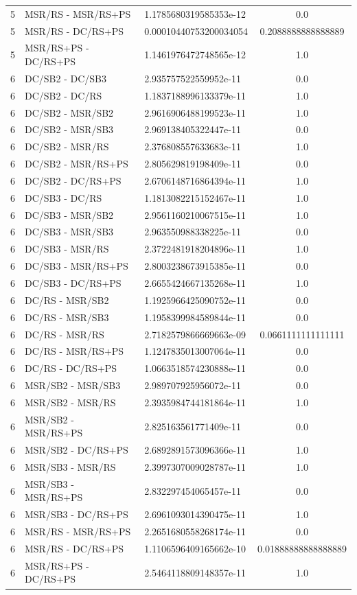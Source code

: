 \documentclass[10pt,a4paper]{article}
\begin{document}
\begin{longtable}{c l l c}
5 & MSR/RS - MSR/RS+PS & 1.1785680319585353e-12 & 0.0 \\
5 & MSR/RS - DC/RS+PS & 0.00010440753200034054 & 0.2088888888888889 \\
5 & MSR/RS+PS - DC/RS+PS & 1.1461976472748565e-12 & 1.0 \\
\midrule
6 & DC/SB2 - DC/SB3 & 2.935757522559952e-11 & 0.0 \\
6 & DC/SB2 - DC/RS & 1.1837188996133379e-11 & 1.0 \\
6 & DC/SB2 - MSR/SB2 & 2.9616906488199523e-11 & 1.0 \\
6 & DC/SB2 - MSR/SB3 & 2.969138405322447e-11 & 0.0 \\
6 & DC/SB2 - MSR/RS & 2.376808557633683e-11 & 1.0 \\
6 & DC/SB2 - MSR/RS+PS & 2.805629819198409e-11 & 0.0 \\
6 & DC/SB2 - DC/RS+PS & 2.6706148716864394e-11 & 1.0 \\
6 & DC/SB3 - DC/RS & 1.1813082215152467e-11 & 1.0 \\
6 & DC/SB3 - MSR/SB2 & 2.9561160210067515e-11 & 1.0 \\
6 & DC/SB3 - MSR/SB3 & 2.963550988338225e-11 & 0.0 \\
6 & DC/SB3 - MSR/RS & 2.3722481918204896e-11 & 1.0 \\
6 & DC/SB3 - MSR/RS+PS & 2.8003238673915385e-11 & 0.0 \\
6 & DC/SB3 - DC/RS+PS & 2.6655424667135268e-11 & 1.0 \\
6 & DC/RS - MSR/SB2 & 1.1925966425090752e-11 & 0.0 \\
6 & DC/RS - MSR/SB3 & 1.1958399984589844e-11 & 0.0 \\
6 & DC/RS - MSR/RS & 2.7182579866669663e-09 & 0.0661111111111111 \\
6 & DC/RS - MSR/RS+PS & 1.1247835013007064e-11 & 0.0 \\
6 & DC/RS - DC/RS+PS & 1.0663518574230888e-11 & 0.0 \\
6 & MSR/SB2 - MSR/SB3 & 2.989707925956072e-11 & 0.0 \\
6 & MSR/SB2 - MSR/RS & 2.3935984744181864e-11 & 1.0 \\
6 & MSR/SB2 - MSR/RS+PS & 2.825163561771409e-11 & 0.0 \\
6 & MSR/SB2 - DC/RS+PS & 2.6892891573096366e-11 & 1.0 \\
6 & MSR/SB3 - MSR/RS & 2.3997307009028787e-11 & 1.0 \\
6 & MSR/SB3 - MSR/RS+PS & 2.832297454065457e-11 & 0.0 \\
6 & MSR/SB3 - DC/RS+PS & 2.6961093014390475e-11 & 1.0 \\
6 & MSR/RS - MSR/RS+PS & 2.2651680558268174e-11 & 0.0 \\
6 & MSR/RS - DC/RS+PS & 1.1106596409165662e-10 & 0.01888888888888889 \\
6 & MSR/RS+PS - DC/RS+PS & 2.5464118809148357e-11 & 1.0 \\
\end{longtable}
\end{document}
